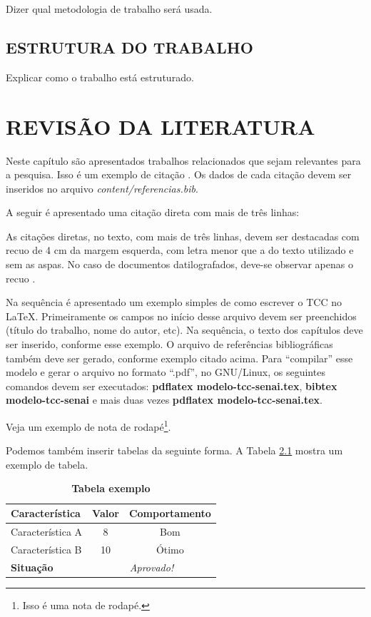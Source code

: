 \documentclass[
	12pt,				%
	openright,			%
	oneside,			%
	a4paper,			%
	chapter=TITLE,		%
	section=TITLE,		%
	brazil				%
	]{abntex2}
\begin{document}
Dizer qual metodologia de trabalho será usada.

\section{ESTRUTURA DO TRABALHO}

Explicar como o trabalho está estruturado.

\chapter{REVISÃO DA LITERATURA}\label{cap-revisao}

Neste capítulo são apresentados trabalhos relacionados que sejam relevantes para a pesquisa. Isso é um exemplo de citação \cite[p. 10]{van86}. Os dados de cada citação devem ser inseridos no arquivo \textit{content/referencias.bib}.

A seguir é apresentado uma citação direta com mais de três linhas:

\begin{citacao}
As citações diretas, no texto, com mais de três linhas, devem ser destacadas com recuo de 4 cm da margem esquerda, com letra menor que a do texto utilizado e sem as aspas. No caso de documentos datilografados, deve-se observar apenas o recuo \cite[p. 10]{NBR10520:2002}.
\end{citacao}

Na sequência é apresentado um exemplo simples de como escrever o TCC no \LaTeX. Primeiramente os campos no início desse arquivo devem ser preenchidos (título do trabalho, nome do autor, etc). Na sequência, o texto dos capítulos deve ser inserido, conforme esse exemplo. O arquivo de referências bibliográficas também deve ser gerado, conforme exemplo citado acima. Para ``compilar'' esse modelo e gerar o arquivo no formato ``.pdf'', no GNU/Linux, os seguintes comandos devem ser executados: \textbf{pdflatex modelo-tcc-senai.tex}, \textbf{bibtex modelo-tcc-senai} e mais duas vezes \textbf{pdflatex modelo-tcc-senai.tex}. 

Veja um exemplo de nota de rodapé\footnote{Isso é uma nota de rodapé.}.

Podemos também inserir tabelas da seguinte forma. A Tabela \ref{tab-exemplo} mostra um exemplo de tabela.

\begin{table}[h!]
\center\scriptsize
\caption{\textbf{Tabela exemplo}}
\begin{tabular}{|l|c|c|} \hline \label{tab-exemplo}
\textbf{ Característica}	& \textbf{Valor} 	& \textbf{ Comportamento} \\ \hline
Característica A 		& 8			& Bom \\ \hline
Característica B		& 10			&Ótimo \\ \hline
\textbf{Situação}		& \multicolumn{2}{c|}{\textit{Aprovado!}} \\ \hline
\end{tabular}
\end{table}
\end{document}

